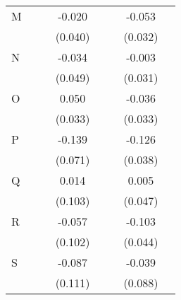 {\begin{longtable}{l*{3}{c}|l*{3}{c}}
		M                   &                     &                     &      -0.020         &                     &                     &      -0.053         \\
		&                     &                     &     (0.040)         &                     &                     &     (0.032)         \\
		N                   &                     &                     &      -0.034         &                     &                     &      -0.003         \\
		&                     &                     &     (0.049)         &                     &                     &     (0.031)         \\
		O                   &                     &                     &       0.050         &                     &                     &      -0.036         \\
		&                     &                     &     (0.033)         &                     &                     &     (0.033)         \\
		P                   &                     &                     &      -0.139\sym{*}  &                     &                     &      -0.126\sym{**} \\
		&                     &                     &     (0.071)         &                     &                     &     (0.038)         \\
		Q                   &                     &                     &       0.014         &                     &                     &       0.005         \\
		&                     &                     &     (0.103)         &                     &                     &     (0.047)         \\
		R                   &                     &                     &      -0.057         &                     &                     &      -0.103\sym{*}  \\
		&                     &                     &     (0.102)         &                     &                     &     (0.044)         \\
		S                   &                     &                     &      -0.087         &                     &                     &      -0.039         \\
		&                     &                     &     (0.111)         &                     &                     &     (0.088)         \\

\end{longtable}}
